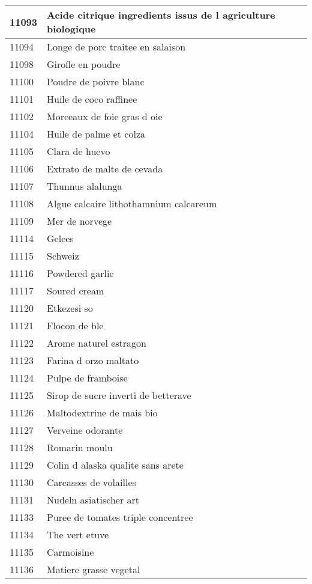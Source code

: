 \begin{longtable}{|l|l|}
11093 & Acide citrique  ingredients issus de l agriculture biologique \\ \hline 
11094 & Longe de porc traitee en salaison \\ \hline 
11098 & Girofle en poudre \\ \hline 
11100 & Poudre de poivre blanc \\ \hline 
11101 & Huile de coco raffinee \\ \hline 
11102 & Morceaux de foie gras d oie \\ \hline 
11104 & Huile de palme et colza \\ \hline 
11105 & Clara de huevo \\ \hline 
11106 & Extrato de malte de cevada \\ \hline 
11107 & Thunnus alalunga \\ \hline 
11108 & Algue calcaire lithothamnium calcareum \\ \hline 
11109 & Mer de norvege \\ \hline 
11114 & Gelees \\ \hline 
11115 & Schweiz \\ \hline 
11116 & Powdered garlic \\ \hline 
11117 & Soured cream \\ \hline 
11120 & Etkezesi so \\ \hline 
11121 & Flocon de ble \\ \hline 
11122 & Arome naturel estragon \\ \hline 
11123 & Farina d orzo maltato \\ \hline 
11124 & Pulpe de framboise \\ \hline 
11125 & Sirop de sucre inverti de betterave \\ \hline 
11126 & Maltodextrine de mais bio \\ \hline 
11127 & Verveine odorante \\ \hline 
11128 & Romarin moulu \\ \hline 
11129 & Colin d alaska qualite sans arete \\ \hline 
11130 & Carcasses de volailles \\ \hline 
11131 & Nudeln asiatischer art \\ \hline 
11133 & Puree de tomates triple concentree \\ \hline 
11134 & The vert etuve \\ \hline 
11135 & Carmoisine \\ \hline 
11136 & Matiere grasse vegetal \\ \hline 

\end{longtable}
